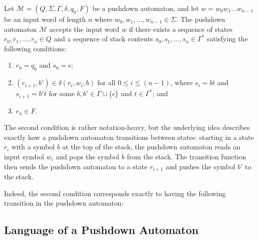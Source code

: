 \begin{definition}
Let $\mathcal{M} = (Q, \Sigma, \Gamma, \delta, q_{0}, F)$ be a pushdown automaton, and let $w = w_{0} w_{1} \dots w_{n-1}$ be an input word of length $n$ where $w_{0}, w_{1}, \dots, w_{n - 1} \in \Sigma$. The pushdown automaton $\mathcal{M}$ accepts the input word $w$ if there exists a sequence of states $r_{0}, r_{1}, \dots, r_{n} \in Q$ and a sequence of stack contents $s_{0}, s_{1}, \dots, s_{n} \in \Gamma^{*}$ satisfying the following conditions:
\begin{enumerate}
\item $r_{0} = q_{0}$ and $s_{0} = \epsilon$;
\item $(r_{i+1}, b') \in \delta(r_{i}, w_{i}, b)$ for all $0 \leq i \leq (n-1)$, where $s_{i} = bt$ and $s_{i+1} = b't$ for some $b, b' \in \Gamma \cup \{\epsilon\}$ and $t \in \Gamma^{*}$; and
\item $r_{n} \in F$.
\end{enumerate}
\end{definition}

The second condition is rather notation-heavy, but the underlying idea describes exactly how a pushdown automaton transitions between states: starting in a state $r_{i}$ with a symbol $b$ at the top of the stack, the pushdown automaton reads an input symbol $w_{i}$ and pops the symbol $b$ from the stack. The transition function then sends the pushdown automaton to a state $r_{i+1}$ and pushes the symbol $b'$ to the stack.

Indeed, the second condition corresponds exactly to having the following transition in the pushdown automaton:
\begin{center}
\end{center}

\subsection{Language of a Pushdown Automaton}

